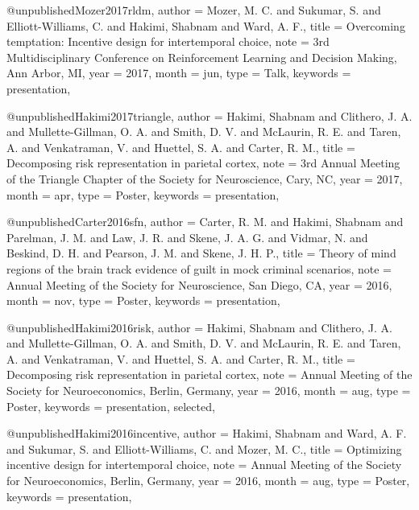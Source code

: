 @unpublished{Mozer2017rldm,
  author   = {Mozer, M. C. and Sukumar, S. and Elliott-Williams, C.
              and Hakimi, Shabnam and Ward, A. F.},
  title    = {Overcoming temptation: Incentive design for intertemporal
              choice},
  note     = {3rd Multidisciplinary Conference on Reinforcement Learning
              and Decision Making, Ann Arbor, MI},
  year     = {2017},
  month    = jun,
  type     = {Talk},
  keywords = {presentation},
}

@unpublished{Hakimi2017triangle,
  author   = {Hakimi, Shabnam and Clithero, J. A.
              and Mullette-Gillman, O. A. and Smith, D. V.
              and McLaurin, R. E. and Taren, A. and Venkatraman, V.
              and Huettel, S. A. and Carter, R. M.},
  title    = {Decomposing risk representation in parietal cortex},
  note     = {3rd Annual Meeting of the Triangle Chapter of the Society
              for Neuroscience, Cary, NC},
  year     = {2017},
  month    = apr,
  type     = {Poster},
  keywords = {presentation},
}


@unpublished{Carter2016sfn,
  author   = {Carter, R. M. and Hakimi, Shabnam and Parelman, J. M.
              and Law, J. R. and Skene, J. A. G. and Vidmar, N.
              and Beskind, D. H. and Pearson, J. M. and Skene, J. H. P.},
  title    = {Theory of mind regions of the brain track evidence of guilt
              in mock criminal scenarios},
  note     = {Annual Meeting of the Society for Neuroscience,
              San Diego, CA},
  year     = {2016},
  month    = nov,
  type     = {Poster},
  keywords = {presentation},
}

@unpublished{Hakimi2016risk,
  author   = {Hakimi, Shabnam and Clithero, J. A.
              and Mullette-Gillman, O. A. and Smith, D. V.
              and McLaurin, R. E. and Taren, A. and Venkatraman, V.
              and Huettel, S. A. and Carter, R. M.},
  title    = {Decomposing risk representation in parietal cortex},
  note     = {Annual Meeting of the Society for Neuroeconomics,
              Berlin, Germany},
  year     = {2016},
  month    = aug,
  type     = {Poster},
  keywords = {presentation, selected},
}

@unpublished{Hakimi2016incentive,
  author   = {Hakimi, Shabnam and Ward, A. F. and Sukumar, S.
              and Elliott-Williams, C. and Mozer, M. C.},
  title    = {Optimizing incentive design for intertemporal choice},
  note     = {Annual Meeting of the Society for Neuroeconomics,
              Berlin, Germany},
  year     = {2016},
  month    = aug,
  type     = {Poster},
  keywords = {presentation},
}

